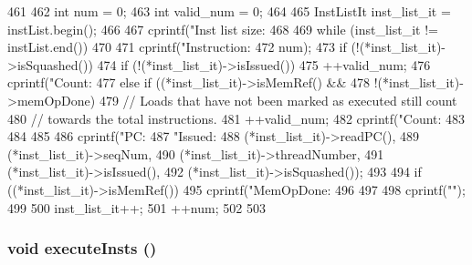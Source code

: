 \begin{DoxyCode}
461 {
462     int num = 0;
463     int valid_num = 0;
464 
465     InstListIt inst_list_it = instList.begin();
466 
467     cprintf("Inst list size: %
468 
469     while (inst_list_it != instList.end())
470     {
471         cprintf("Instruction:%
472                 num);
473         if (!(*inst_list_it)->isSquashed()) {
474             if (!(*inst_list_it)->isIssued()) {
475                 ++valid_num;
476                 cprintf("Count:%
477             } else if ((*inst_list_it)->isMemRef() &&
478                        !(*inst_list_it)->memOpDone) {
479                 // Loads that have not been marked as executed still count
480                 // towards the total instructions.
481                 ++valid_num;
482                 cprintf("Count:%
483             }
484         }
485 
486         cprintf("PC:%
487                 "Issued:%
488                 (*inst_list_it)->readPC(),
489                 (*inst_list_it)->seqNum,
490                 (*inst_list_it)->threadNumber,
491                 (*inst_list_it)->isIssued(),
492                 (*inst_list_it)->isSquashed());
493 
494         if ((*inst_list_it)->isMemRef()) {
495             cprintf("MemOpDone:%
496         }
497 
498         cprintf("\n");
499 
500         inst_list_it++;
501         ++num;
502     }
503 }
\end{DoxyCode}
\hypertarget{classInorderBackEnd_a2d00e30d66a56e4667e28df302c98ac0}{
\subsubsection[{executeInsts}]{\setlength{\rightskip}{0pt plus 5cm}void executeInsts ()}}
\label{classInorderBackEnd_a2d00e30d66a56e4667e28df302c98ac0}



